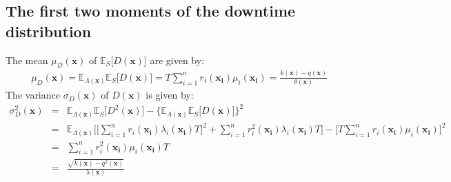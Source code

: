 \documentclass[preprint,12pt]{elsarticle}
\begin{document}
\subsection{The first two moments of the downtime distribution}
The mean $\mu_{D}(\boldsymbol{x})$ of $\mathbb{E}_{S}\bigg[D(\boldsymbol{x})\bigg]$ are given by:
\begin{eqnarray}
\mu_{D}(\boldsymbol{x})=\mathbb{E}_{\Lambda(\boldsymbol{x})}\mathbb{E}_{S} \bigg[D(\boldsymbol{x}) \bigg]=T\sum_{i=1}^{n}{r_{i}(\boldsymbol{x_i})\mu_{i}(\boldsymbol{x_i})}=\frac{k(\boldsymbol{x})-q(\boldsymbol{x})}{\theta(\boldsymbol{x})}
\label{muD}
\end{eqnarray}
The variance $\sigma_{D}(\boldsymbol{x})$ of $D(\boldsymbol{x})$ is given by:
\begin{eqnarray}
\sigma^{2}_{D}(\boldsymbol{x})&=&\mathbb{E}_{\Lambda(\boldsymbol{x})}\mathbb{E}_{S} \bigg[D^{2}(\boldsymbol{x}) \bigg]- \bigg\{\mathbb{E}_{\Lambda(\boldsymbol{x})}\mathbb{E}_{S}\bigg[D(\boldsymbol{x}) \bigg] \bigg\}^{2} \nonumber\\
&=& \mathbb{E}_{\Lambda(\boldsymbol{x})}\bigg[\bigg[\sum_{i=1}^{n}{r_{i}(\boldsymbol{x_{i}})\lambda_{i}(\boldsymbol{x_{i}})T}\bigg]^{2} +\sum_{i=1}^{n}{r_{i}^{2}(\boldsymbol{x_{i}})\lambda_{i}(\boldsymbol{x_{i}})T}\bigg]-\bigg[T\sum_{i=1}^{n}{r_{i}(\boldsymbol{x_i})\mu_{i}(\boldsymbol{x_i})}\bigg]^{2}\nonumber\\
&=&\sum_{i=1}^{n}{r_{i}^{2}(\boldsymbol{x_i})\mu_{i}(\boldsymbol{x_i})T}\nonumber\\
&=&\frac{\sqrt{k(\boldsymbol{x})-q^{2}(\boldsymbol{x})}}{\lambda(\boldsymbol{x})}
\end{eqnarray}
\end{document}
